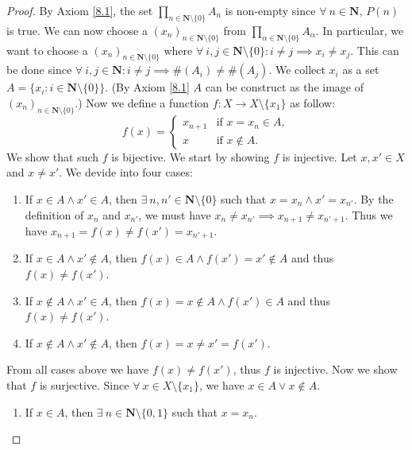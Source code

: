 \begin{proof}
    By Axiom \ref{8.1}, the set \(\prod_{n \in \mathbf{N} \setminus \{0\}} A_n\) is non-empty since \(\forall\ n \in \mathbf{N}\), \(P(n)\) is true.
    We can now choose a \((x_n)_{n \in \mathbf{N} \setminus \{0\}}\) from \(\prod_{\alpha \in \mathbf{N} \setminus \{0\}} A_{\alpha}\).
    In particular, we want to choose a \((x_n)_{n \in \mathbf{N} \setminus \{0\}}\) where \(\forall\ i, j \in \mathbf{N} \setminus \{0\} : i \neq j \implies x_i \neq x_j\).
    This can be done since \(\forall\ i, j \in \mathbf{N} : i \neq j \implies \#(A_i) \neq \#(A_j)\).
    We collect \(x_i\) as a set \(A = \{x_i : i \in \mathbf{N} \setminus \{0\}\}\).
    (By Axiom \ref{8.1} \(A\) can be construct as the image of \((x_n)_{n \in \mathbf{N} \setminus \{0\}}\).)
    Now we define a function \(f : X \to X \setminus \{x_1\}\) as follow:
    \[
        f(x) = \begin{cases}
            x_{n + 1} & \text{if } x = x_n \in A, \\
            x         & \text{if } x \notin A.
        \end{cases}
    \]
    We show that such \(f\) is bijective.
    We start by showing \(f\) is injective.
    Let \(x, x' \in X\) and \(x \neq x'\).
    We devide into four cases:
    \begin{enumerate}
        \item If \(x \in A \land x' \in A\), then \(\exists\ n, n' \in \mathbf{N} \setminus \{0\}\) such that \(x = x_n \land x' = x_{n'}\).
              By the definition of \(x_n\) and \(x_{n'}\), we must have \(x_n \neq x_{n'} \implies x_{n + 1} \neq x_{n' + 1}\).
              Thus we have \(x_{n + 1} = f(x) \neq f(x') = x_{n' + 1}\).
        \item If \(x \in A \land x' \notin A\), then \(f(x) \in A \land f(x') = x' \notin A\) and thus \(f(x) \neq f(x')\).
        \item If \(x \notin A \land x' \in A\), then \(f(x) = x \notin A \land f(x') \in A\) and thus \(f(x) \neq f(x')\).
        \item If \(x \notin A \land x' \notin A\), then \(f(x) = x \neq x' = f(x')\).
    \end{enumerate}
    From all cases above we have \(f(x) \neq f(x')\), thus \(f\) is injective.
    Now we show that \(f\) is surjective.
    Since \(\forall\ x \in X \setminus \{x_1\}\), we have \(x \in A \lor x \notin A\).
    \begin{enumerate}
        \item If \(x \in A\), then \(\exists\ n \in \mathbf{N} \setminus \{0, 1\}\) such that \(x = x_n\).

\end{enumerate}
\end{proof}
